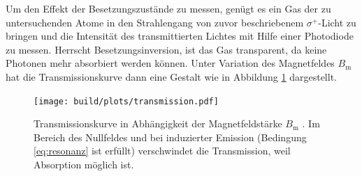 Um den Effekt der Besetzungszustände zu messen, genügt es ein Gas der zu
untersuchenden Atome in den Strahlengang von zuvor beschriebenem
$\sigma^+$-Licht zu bringen und die Intensität des transmittierten Lichtes mit
Hilfe einer Photodiode zu messen. Herrscht Besetzungsinversion, ist das Gas
transparent, da keine Photonen mehr absorbiert werden können. Unter Variation
des Magnetfeldes $B_\text{m}$ hat die Transmissionskurve dann eine Gestalt wie
in Abbildung \ref{fig:transmission} dargestellt.
\begin{figure}
    \centering
    \texttt{[image: build/plots/transmission.pdf]}
    \caption{
        Transmissionskurve in Abhängigkeit der Magnetfeldstärke $B_\text{m}$
        \cite{V21}. Im Bereich des Nullfeldes und bei induzierter Emission
        (Bedingung \ref{eq:resonanz} ist erfüllt) verschwindet die
        Transmission, weil Absorption möglich ist.
    }
    \label{fig:transmission}
\end{figure}
